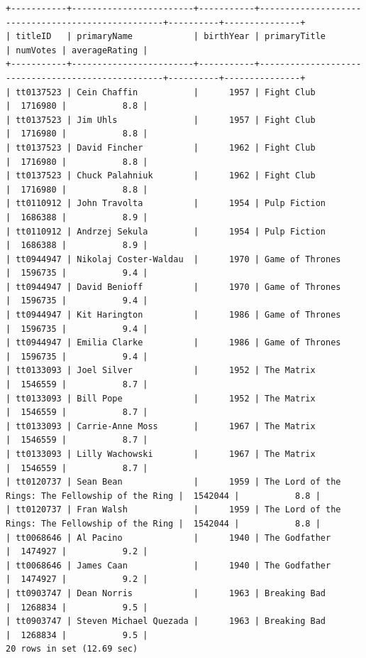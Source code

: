 \documentclass[12pt,a4paper]{article}
\begin{document}
\begin{lstlisting}[basicstyle = \tiny\ttfamily, columns = fixed]
+-----------+------------------------+-----------+---------------------------------------------------+----------+---------------+
| titleID   | primaryName            | birthYear | primaryTitle                                      | numVotes | averageRating |
+-----------+------------------------+-----------+---------------------------------------------------+----------+---------------+
| tt0137523 | Cein Chaffin           |      1957 | Fight Club                                        |  1716980 |           8.8 |
| tt0137523 | Jim Uhls               |      1957 | Fight Club                                        |  1716980 |           8.8 |
| tt0137523 | David Fincher          |      1962 | Fight Club                                        |  1716980 |           8.8 |
| tt0137523 | Chuck Palahniuk        |      1962 | Fight Club                                        |  1716980 |           8.8 |
| tt0110912 | John Travolta          |      1954 | Pulp Fiction                                      |  1686388 |           8.9 |
| tt0110912 | Andrzej Sekula         |      1954 | Pulp Fiction                                      |  1686388 |           8.9 |
| tt0944947 | Nikolaj Coster-Waldau  |      1970 | Game of Thrones                                   |  1596735 |           9.4 |
| tt0944947 | David Benioff          |      1970 | Game of Thrones                                   |  1596735 |           9.4 |
| tt0944947 | Kit Harington          |      1986 | Game of Thrones                                   |  1596735 |           9.4 |
| tt0944947 | Emilia Clarke          |      1986 | Game of Thrones                                   |  1596735 |           9.4 |
| tt0133093 | Joel Silver            |      1952 | The Matrix                                        |  1546559 |           8.7 |
| tt0133093 | Bill Pope              |      1952 | The Matrix                                        |  1546559 |           8.7 |
| tt0133093 | Carrie-Anne Moss       |      1967 | The Matrix                                        |  1546559 |           8.7 |
| tt0133093 | Lilly Wachowski        |      1967 | The Matrix                                        |  1546559 |           8.7 |
| tt0120737 | Sean Bean              |      1959 | The Lord of the Rings: The Fellowship of the Ring |  1542044 |           8.8 |
| tt0120737 | Fran Walsh             |      1959 | The Lord of the Rings: The Fellowship of the Ring |  1542044 |           8.8 |
| tt0068646 | Al Pacino              |      1940 | The Godfather                                     |  1474927 |           9.2 |
| tt0068646 | James Caan             |      1940 | The Godfather                                     |  1474927 |           9.2 |
| tt0903747 | Dean Norris            |      1963 | Breaking Bad                                      |  1268834 |           9.5 |
| tt0903747 | Steven Michael Quezada |      1963 | Breaking Bad                                      |  1268834 |           9.5 |
20 rows in set (12.69 sec)
\end{lstlisting}
\end{document}
